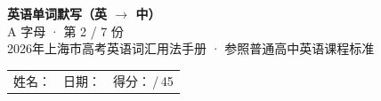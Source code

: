 \documentclass[10pt,a4paper]{article}
\begin{document}
\pagestyle{plain}

\begin{center}
{\LARGE\bfseries 英语单词默写（英 $\to$ 中）}\\[0.22em]
{\large A 字母 · 第 2 / 7 份}\\[0.18em]
{\small 2026年上海市高考英语词汇用法手册 · 参照普通高中英语课程标准}
\end{center}

\vspace{0.25em}
\noindent\begin{tabular}{@{}p{}@{}p{}@{}p{}@{}}
姓名：\underline{\hspace{2.0cm}} & 日期：\underline{\hspace{2.0cm}} & 得分：\underline{\hspace{1.3cm}}\,/\,45 \\
\end{tabular}

\vspace{0.3em}

\vspace{0.08em}
\end{document}
